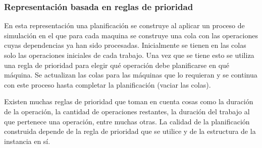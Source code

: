 \subsubsection*{Representación basada en reglas de prioridad}
En esta representación una planificación se construye al aplicar un proceso de simulación en el que para cada maquina se construye una cola con las operaciones cuyas dependencias ya han sido procesadas. Inicialmente se tienen en las colas solo las operaciones iniciales de cada trabajo. Una vez que se tiene esto se utiliza una regla de prioridad para elegir qué operación debe planificarse en qué máquina. Se actualizan las colas para las máquinas que lo requieran y se continua con este proceso hasta completar la planificación (vaciar las colas).

Existen muchas reglas de prioridad que toman en cuenta cosas como la duración de la operación, la cantidad de operaciones restantes, la duración del trabajo al que pertenece una operación, entre muchas otras. La calidad de la planificación construida depende de la regla de prioridad que se utilice y de la estructura de la instancia en sí.

